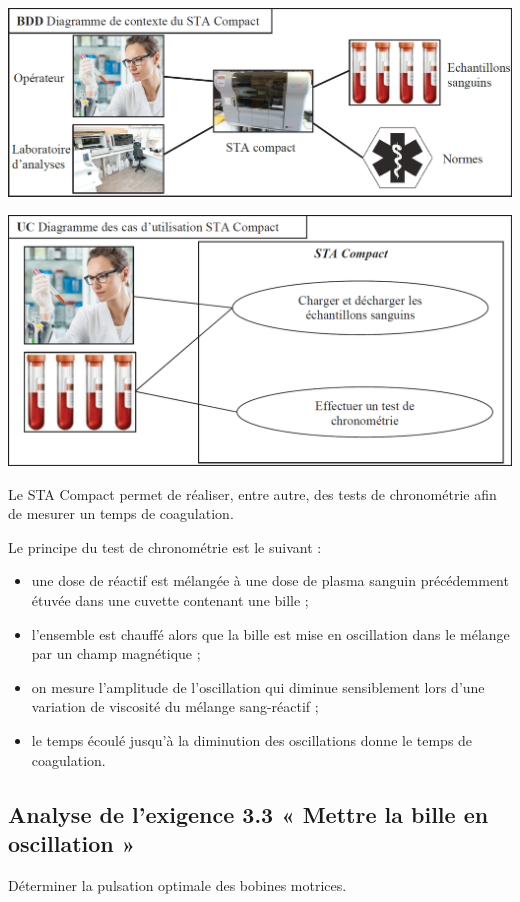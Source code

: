 \documentclass[10pt,fleqn]{article} %
\begin{document}
\begin{center}
\includegraphics[width=.8\linewidth]{images/ccp_02}
\end{center}

\begin{center}
\includegraphics[width=.8\linewidth]{images/ccp_03}
\end{center}

Le STA Compact permet de réaliser, entre autre, des tests de chronométrie afin de mesurer un
temps de coagulation.

Le principe du test de chronométrie est le suivant :
\begin{itemize}
\item une dose de réactif est mélangée à une dose de plasma sanguin précédemment étuvée dans
une cuvette contenant une bille ;
\item l’ensemble est chauffé alors que la bille est mise en oscillation dans le mélange par un
champ magnétique ;
\item on mesure l’amplitude de l’oscillation qui diminue sensiblement lors d’une variation de
viscosité du mélange sang-réactif ;
\item le temps écoulé jusqu’à la diminution des oscillations donne le temps de coagulation.
\end{itemize}

\subsection{Analyse de l’exigence 3.3 « Mettre la bille en oscillation »}
\begin{obj}
Déterminer la pulsation optimale des bobines motrices.
\end{obj}
\end{document}
